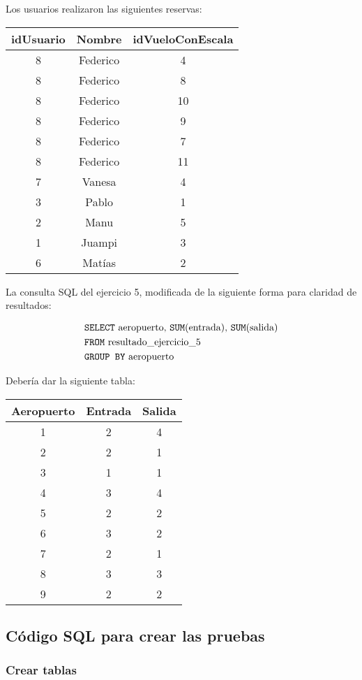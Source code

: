 Los usuarios realizaron las siguientes reservas:
\begin{center}
	\begin{tabular}{ c | c | c }
	\textbf{idUsuario} & \textbf{Nombre} & \textbf{idVueloConEscala} \\ \hline
		8 & Federico & 4 \\
		8 & Federico & 8 \\
		8 & Federico & 10 \\
		8 & Federico & 9 \\
		8 & Federico & 7 \\
		8 & Federico & 11 \\
		7 & Vanesa & 4 \\
		3 & Pablo & 1 \\
		2 & Manu & 5 \\
		1 & Juampi & 3 \\
		6 & Matías & 2 \\
	\end{tabular}
\end{center}

La consulta SQL del ejercicio 5, modificada de la siguiente forma para claridad de resultados:

\begin{align*}
	& \text{\texttt{SELECT} aeropuerto, \texttt{SUM}(entrada), \texttt{SUM}(salida)} \\
	& \text{\texttt{FROM} resultado\_ejercicio\_5} \\
	& \text{\texttt{GROUP BY} aeropuerto} \\
\end{align*}

Debería dar la siguiente tabla:
\begin{center}
	\begin{tabular}{ c | c | c}
		\textbf{Aeropuerto} & \textbf{Entrada} & \textbf{Salida} \\ \hline
		1 & 2 & 4 \\
		2 & 2 & 1 \\
		3 & 1 & 1 \\
		4 & 3 & 4 \\
		5 & 2 & 2 \\
		6 & 3 & 2 \\
		7 & 2 & 1 \\
		8 & 3 & 3 \\
		9 & 2 & 2 \\
	\end{tabular}
\end{center}

\subsection{Código SQL para crear las pruebas}
\subsubsection{Crear tablas}


% 
